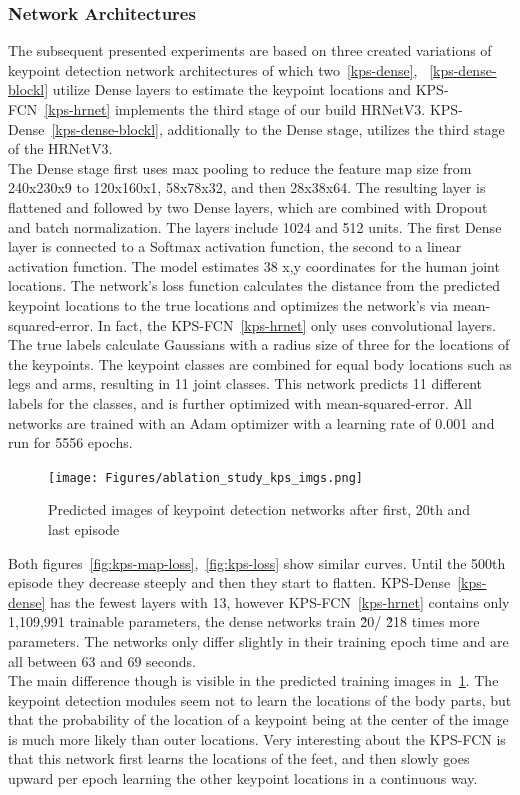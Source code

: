 \subsubsection{Network Architectures}
The subsequent presented experiments are based on
three created variations of keypoint detection network architectures of which two~\ref{kps-dense},
~\ref{kps-dense-blockl}
utilize Dense layers to estimate the keypoint locations and KPS-FCN~\ref{kps-hrnet} implements the third stage of our
build HRNetV3.
KPS-Dense~\ref{kps-dense-blockl}, additionally to the Dense stage, utilizes the third stage of the HRNetV3.\\
The Dense stage first uses max pooling to reduce the feature map size from 240x230x9 to 120x160x1, 58x78x32, and then
28x38x64.
The resulting  layer is flattened and followed by two Dense layers, which are combined with Dropout and
batch normalization.
The layers include 1024 and 512 units.
The first Dense layer is connected to a Softmax activation function,
the second to a linear activation function. The model estimates 38 x,y coordinates for the human joint locations.
The network's loss function calculates the distance from the predicted keypoint locations to the true locations and
optimizes
the network's via mean-squared-error.
In fact, the KPS-FCN~\ref{kps-hrnet} only uses convolutional layers.
The true labels calculate Gaussians with a radius size of three for the locations of the keypoints.
The keypoint classes are combined for equal body locations such as legs and arms, resulting in 11 joint classes.
This network predicts 11 different labels for the classes, and is further optimized with mean-squared-error.
%
All networks are trained with an Adam optimizer with a learning rate of 0.001 and run for 5556 epochs.
%
\begin{figure}[H]
    \centering
    \texttt{[image: Figures/ablation\_study\_kps\_imgs.png]}
    \decoRule
    \caption[Ablation Keypoints Detection Module: Predicted Training Images]{Predicted images of keypoint detection networks
    after first, 20th and last episode}
    \label{fig:kps-train-imgs}
\end{figure}
%
Both figures~\ref{fig:kps-map-loss},~\ref{fig:kps-loss} show similar curves.
Until the 500th episode they decrease steeply and then they start to flatten.
KPS-Dense~\ref{kps-dense} has the fewest layers with 13, however KPS-FCN~\ref{kps-hrnet} contains only 1,109,991
trainable parameters, the dense networks train \~20/ \~218 times more parameters.
The networks only differ slightly in their training epoch time and are all between 63 and 69 seconds.\\
The main difference though is visible in the predicted training images in~\ref{fig:kps-train-imgs}.
The keypoint detection modules seem not to learn the locations of the body parts, but that the probability of the location
of a keypoint being at the center of the image is much more likely than outer locations.
Very interesting about the KPS-FCN is that this network first learns the locations of the feet, and then slowly goes
upward per epoch learning the other keypoint locations in a continuous way.


